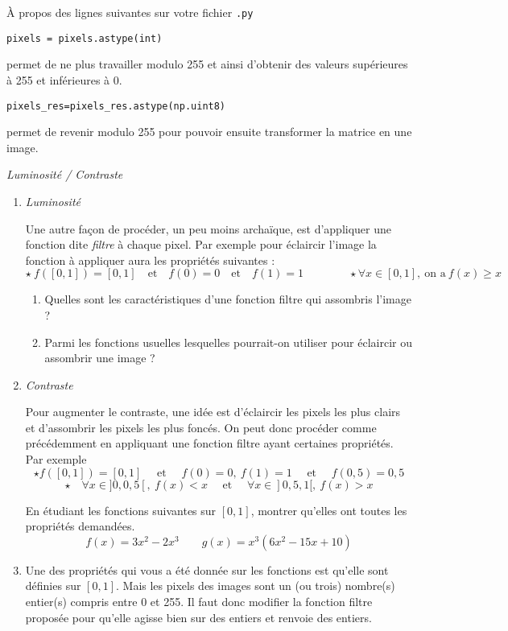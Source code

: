 \documentclass[10pt,a4paper,pdftex]{book}
\begin{document}
\Rq À propos des lignes suivantes sur votre fichier \texttt{.py}
\begin{lstlisting}[style=compil]
pixels = pixels.astype(int)
\end{lstlisting}
permet de ne plus travailler modulo 255 et ainsi d'obtenir des valeurs supérieures à 255 et inférieures à 0. 
\begin{lstlisting}[style=compil]
pixels_res=pixels_res.astype(np.uint8)
\end{lstlisting}
permet de revenir modulo 255 pour pouvoir ensuite transformer la matrice en une image.


\begin{exoc}{\textit{Luminosité / Contraste}}

\begin{enumerate}
\item \textit{Luminosité}

Une autre façon de procéder, un peu moins archaïque, est d'appliquer une fonction dite \textit{filtre} à chaque pixel. Par exemple pour éclaircir l'image la fonction à appliquer aura les propriétés suivantes :
$$\star\ f\left([0,1]\right)=[0,1]\quad \text{et}\quad f(0)=0\quad \text{et}\quad f(1)=1\qquad\qquad \star \forall x \in [0,1],\ \text{on a}\ f(x) \geqslant x$$

\begin{enumerate}
\item Quelles sont les caractéristiques d'une fonction filtre qui assombris l'image ?
\item Parmi les fonctions usuelles lesquelles pourrait-on utiliser pour éclaircir ou assombrir une image ?
\end{enumerate}
\item \textit{Contraste}

Pour augmenter le contraste, une idée est d'éclaircir les pixels les plus clairs et d'assombrir les pixels les plus foncés. On peut donc procéder comme précédemment en appliquant une fonction filtre ayant certaines propriétés. Par exemple 
$$
\star f\left([0,1]\right)=[0,1] \quad \text{ et }\quad  f(0)=0,\ f(1)=1 \quad \text{ et }\quad  f(0,5)=0,5
$$
$$\star\quad \forall x \in ]0,0,5[,\ f(x) < x\quad \text{ et }\quad \forall x \in ]0,5,1[,\ f(x) > x
$$

En étudiant les fonctions suivantes sur $[0,1]$, montrer qu'elles ont toutes les propriétés demandées. 
$$f(x)=3x^2-2x^3\qquad g(x)=x^3(6x^2-15x+10)$$
\item Une des propriétés qui vous a été donnée sur les fonctions est qu'elle sont définies sur $[0,1]$. Mais les pixels des images sont un (ou trois) nombre(s) entier(s) compris entre 0 et 255. Il faut donc modifier la fonction filtre proposée pour qu'elle agisse bien sur des entiers et renvoie des entiers.


\end{enumerate}
\end{exoc}
\end{document}
